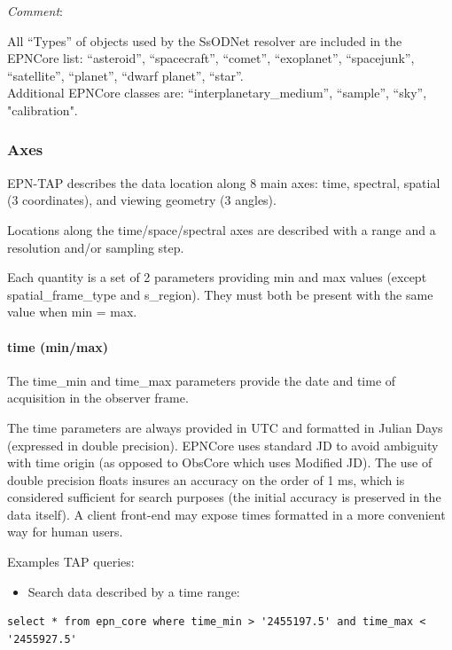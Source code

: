 \documentclass[11pt,a4paper]{ivoa}
\begin{document}
\emph{Comment}: 

All ``Types'' of objects used by the SsODNet resolver are included in the EPNCore list: ``asteroid'', ``spacecraft'', ``comet'', ``exoplanet'', ``spacejunk'', ``satellite'', ``planet'', ``dwarf planet'', ``star''.\\Additional EPNCore classes are: ``interplanetary\_medium'', ``sample'', ``sky'', "calibration".


\subsubsection{Axes}

EPN-TAP describes the data location along 8 main axes: time, spectral, spatial (3 coordinates), and viewing geometry (3 angles). 

Locations along the time/space/spectral axes are described with a range and a resolution and/or sampling step. 

Each quantity is a set of 2 parameters providing min and max values (except spatial\_frame\_type and s\_region). They must both be present with the same value when min = max.

\paragraph{time (min/max)}

The time\_min and time\_max parameters provide the date and time of acquisition in the observer frame. 

The time parameters are always provided in UTC and formatted in Julian Days (expressed in double precision). EPNCore uses standard JD to avoid ambiguity with time origin (as opposed to ObsCore which uses Modified JD). The use of double precision floats insures an accuracy on the order of 1 ms, which is considered sufficient for search purposes (the initial accuracy is preserved in the data itself). A client front-end may expose times formatted in a more convenient way for human users.

Examples TAP queries:

\begin{itemize}
\item Search data described by a time range:
\end{itemize}

\begin{verbatim}
select * from epn_core where time_min > '2455197.5' and time_max < '2455927.5'
\end{verbatim}
\end{document}
